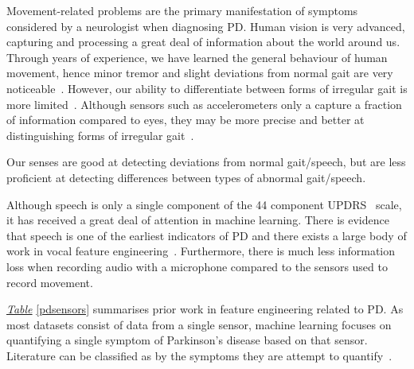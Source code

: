 \documentclass[12pt, twoside]{book}
\begin{document}

Movement-related problems are the primary manifestation of symptoms considered by a neurologist when diagnosing PD. Human vision is very advanced, capturing and processing a great deal of information about the world around us. Through years of experience, we have learned the general behaviour of human movement, hence minor tremor and slight deviations from normal gait are very noticeable~\cite{troje2002decomposing}. However, our ability to differentiate between forms of irregular gait is more limited~\cite{parkinsonismdifferential1}. Although sensors such as accelerometers only a capture a fraction of information compared to eyes, they may be more precise and better at distinguishing forms of irregular gait~\cite{parkinsonismdifferential2}.

\begin{highlight}
Our senses are good at detecting deviations from normal gait/speech, but are less proficient at detecting differences between types of abnormal gait/speech. 
\end{highlight}

Although speech is only a single component of the 44 component UPDRS~\cite{updrs} scale, it has received a great deal of attention in machine learning. There is evidence that speech is one of the earliest indicators of PD \cite{earlyvowel} and there exists a large body of work in vocal feature engineering~\cite{ostextbook}. Furthermore, there is much less information loss when recording audio with a microphone compared to the sensors used to record movement. 


\textit{\hyperref[pdsensors]{Table}} \ref{pdsensors} summarises prior work in feature engineering related to PD. As most datasets consist of data from a single sensor, machine learning focuses on quantifying a single symptom of Parkinson's disease based on that sensor. Literature can be classified as by the symptoms they are attempt to quantify~\cite{review2013,review2015}.
\end{document}
